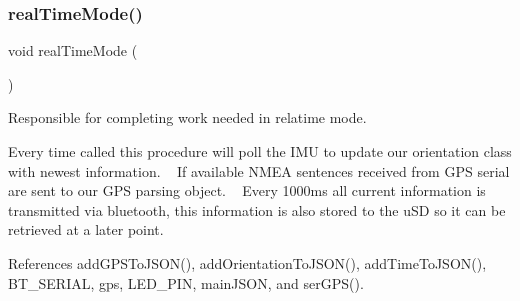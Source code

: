 \mbox{\label{logging-device_8ino_ab4c1c4c0fa047e336f9f4176406a54f1}} 
\subsubsection{\texorpdfstring{real\+Time\+Mode()}{realTimeMode()}}
{\footnotesize\ttfamily void real\+Time\+Mode (\begin{DoxyParamCaption}{ }\end{DoxyParamCaption})}



Responsible for completing work needed in relatime mode. 

Every time called this procedure will poll the I\+MU to update our orientation class with newest information. ~\newline
If available N\+M\+EA sentences received from G\+PS serial are sent to our G\+PS parsing object. ~\newline
 Every 1000ms all current information is transmitted via bluetooth, this information is also stored to the u\+SD so it can be retrieved at a later point. 

References add\+G\+P\+S\+To\+J\+S\+O\+N(), add\+Orientation\+To\+J\+S\+O\+N(), add\+Time\+To\+J\+S\+O\+N(), B\+T\+\_\+\+S\+E\+R\+I\+AL, gps, L\+E\+D\+\_\+\+P\+IN, main\+J\+S\+ON, and ser\+G\+P\+S().


